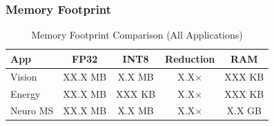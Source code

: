 \subsubsection{Memory Footprint}

\begin{table}[h]
\centering
\caption{Memory Footprint Comparison (All Applications)}
\label{tab:memory}
\begin{tabular}{lcccc}
\hline
\textbf{App} & \textbf{FP32} & \textbf{INT8} & \textbf{Reduction} & \textbf{RAM} \\
\hline
Vision & XX.X MB & X.X MB & X.X$\times$ & XXX KB \\
Energy & XX.X MB & XXX KB & X.X$\times$ & XXX KB \\
Neuro MS & XX.X MB & X.X MB & X.X$\times$ & X.X GB \\
\hline
\end{tabular}
\end{table}

%
%
